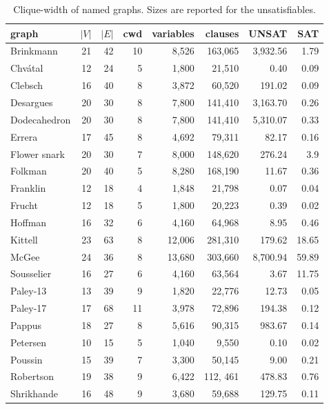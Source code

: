 \documentclass[10pt,usletter]{article}
\theoremstyle{remark}
\begin{document}
\begin{table}[htb]
\centering
\caption{Clique-width of named graphs. Sizes are reported for the unsatisfiables.}\label{table:named}
\medskip
\begin{tabular}{l@{\hspace{5mm}}r@{\hspace{5mm}}r@{\hspace{5mm}}r@{\hspace{5mm}}r@{\hspace{5mm}}r@{\hspace{5mm}}r@{\hspace{5mm}}r}
\toprule
graph & $|V|$ & $|E|$& cwd & variables & clauses & UNSAT  & SAT \\ 
\midrule
Brinkmann & 21 & 42 & 10 & 8,526 & 163,065 & 3,932.56 & 1.79\\Chv\'{a}tal   &                12 & 24 & 5 & 1,800 & 21,510 & 0.40 & 0.09 \\Clebsch &                 16 & 40 & 8 & 3,872 & 60,520 & 191.02 & 0.09\\Desargues &             20 & 30 & 8 & 7,800 & 141,410 & 3,163.70 & 0.26\\Dodecahedron &      20 & 30 & 8 & 7,800 & 141,410 & 5,310.07 & 0.33\\Errera     &                17 & 45 & 8 & 4,692  & 79,311 & 82.17 & 0.16\\Flower snark &      20 & 30 & 7 & 8,000 & 148,620 & 276.24 & 3.9\\Folkman &                20 & 40 & 5 & 8,280 & 168,190 & 11.67 & 0.36\\Franklin &               12 & 18 & 4 & 1,848 & 21,798 & 0.07 & 0.04\\Frucht   &               12 & 18 & 5 & 1,800 & 20,223 & 0.39 & 0.02\\Hoffman &           16  & 32 & 6 & 4,160 & 64,968 & 8.95 & 0.46\\Kittell  &                23  & 63 & 8 & 12,006 & 281,310 & 179.62 & 18.65\\McGee &              24  & 36 & 8 & 13,680 &  303,660 & 8,700.94 & 59.89\\Sousselier &       16  & 27 & 6 & 4,160  & 63,564 & 3.67 & 11.75\\Paley-13  &         13 & 39 & 9 & 1,820 & 22,776 & 12.73 & 0.05 \\ Paley-17 &         17 & 68 & 11 & 3,978 & 72,896 & 194.38 & 0.12\\ Pappus  &            18 & 27 & 8 & 5,616 & 90,315 & 983.67 & 0.14\\Petersen   &         10 & 15 & 5 & 1,040 & 9,550 & 0.10 & 0.02\\ Poussin &            15 & 39 & 7 & 3,300 & 50,145 & 9.00 & 0.21\\Robertson &        19 & 38 & 9 & 6,422 & 112, 461 & 478.83 & 0.76\\ Shrikhande &       16 & 48 & 9 & 3,680 & 59,688 & 129.75 & 0.11\\\toprule
\end{tabular}
\end{table}
\end{document}
